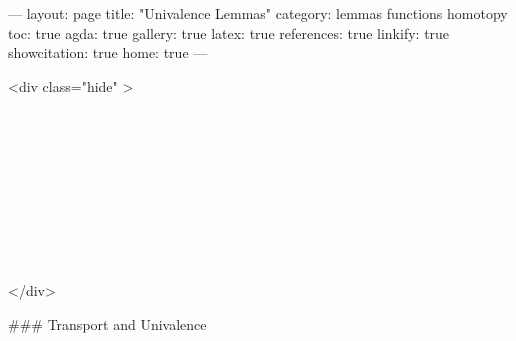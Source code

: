 ---
layout: page
title: "Univalence Lemmas"
category: lemmas functions homotopy
toc: true
agda: true
gallery: true
latex: true
references: true
linkify: true
showcitation: true
home: true
---

<div class="hide" >
\begin{code}%
\>[0]\AgdaSymbol{\{-\#}\AgdaSpace{}%
\AgdaSpace{}%
\AgdaSpace{}%
\AgdaSymbol{\#-\}}\<%
\\
\>[0]\AgdaSpace{}%
\AgdaSpace{}%
\<%
\\
\>[0]\AgdaSpace{}%
\AgdaSpace{}%
\<%
\\
%
\\[\AgdaEmptyExtraSkip]%
\>[0]\AgdaSpace{}%
\AgdaSpace{}%
\<%
\\
\>[0]\AgdaSpace{}%
\AgdaSpace{}%
\<%
\\
\>[0]\AgdaSpace{}%
\AgdaSpace{}%
\<%
\\
%
\\[\AgdaEmptyExtraSkip]%
\>[0]\AgdaSpace{}%
\AgdaSpace{}%
\<%
\end{code}
</div>

### Transport and Univalence

